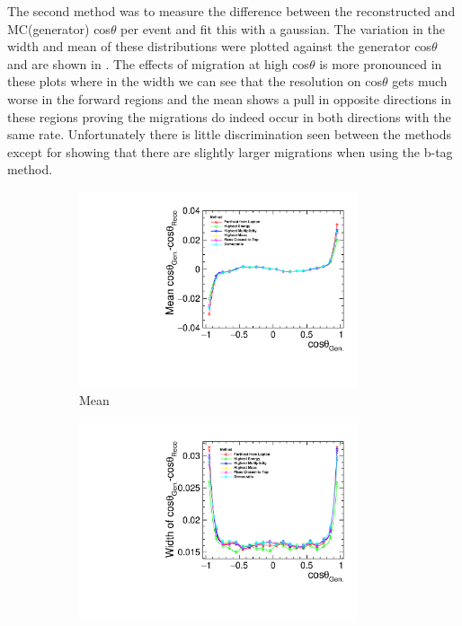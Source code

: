 The second method was to measure the difference between the reconstructed and MC(generator) cos$\theta$ per event and fit this with a gaussian. The variation in the width and mean of these distributions were plotted against the generator cos$\theta$ and are shown in . The effects of migration at high cos$\theta$ is more pronounced in these plots where in the width we can see that the resolution on cos$\theta$ gets much worse in the forward regions and the mean shows a pull in opposite directions in these regions proving the migrations do indeed occur in both directions with the same rate. Unfortunately there is little discrimination seen between the methods except for showing that there are slightly larger migrations when using the b-tag method.

\begin{figure}
  \centering
  \begin{subfigure}{.5\textwidth}
    \centering
    \includegraphics[width=0.9\textwidth]{TopAnalysis/figures/MeanThetaDiff.pdf}
    \caption[Mean]{Mean}
  \end{subfigure}%
  \begin{subfigure}{.5\textwidth}
    \centering
    \includegraphics[width=0.9\textwidth]{TopAnalysis/figures/WidthThetaDiff.pdf}

\end{subfigure}
\end{figure}
